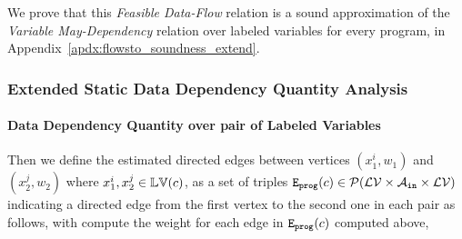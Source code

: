 %
We prove that this \emph{Feasible Data-Flow} relation is a sound approximation 
of the \emph{Variable May-Dependency} relation over labeled variables for every program,
in Appendix~\ref{apdx:flowsto_soundness_extend}.
%
\subsubsection{Extended Static Data Dependency Quantity Analysis}
\label{sec:refine-static-reachability}
\paragraph*{Data Dependency Quantity over pair of Labeled Variables }
Then we define the estimated directed edges
between vertices $({x}_1^{i}, w_1)$  
and $({x}_2^{j}, w_2)$ 
where ${x}_1^{i}, {x}_2^{j} \in \mathbb{LV}(c)$,
as a set of triples 
$\mathtt{{E_{prog}}}(c) \in \mathcal{P}(\mathcal{LV} \times \mathcal{A}_{\mathtt{in}} \times \mathcal{LV})$
indicating a directed edge from the first vertex to the second one in each pair
as follows,
with compute the weight for each edge in $\mathtt{{E_{prog}}}(c)$ computed above,
\highlight{
 \[
   \progE(c) \triangleq
   \left\{ (x^i, w, y^j) 
\mid
(x^i, w, y^j) \in \progE^0(c) \land 
w = \max \left\{ \absclr(\absevent) ~\mid~ \absevent \in \absflow(c) \land \absevent = (i, \_, j) \right\} 
\right\}.
\]
}
